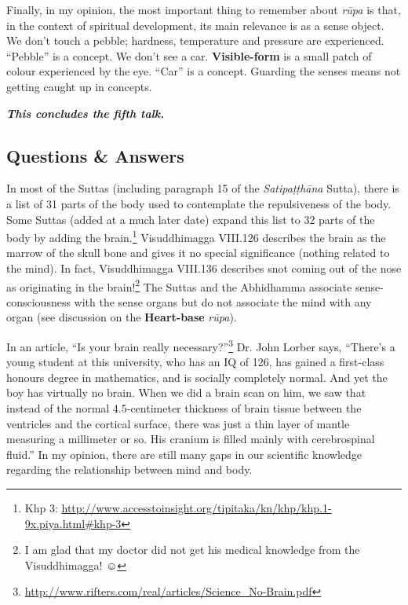 Finally, in my opinion, the most important thing to remember about \textit{rūpa} is that, in the context of spiritual development, its main relevance is as a sense object. We don’t touch a pebble; hardness, temperature and pressure are experienced. “Pebble” is a concept. We don’t see a car. \textbf{Visible-form} is a small patch of colour experienced by the eye. “Car” is a concept. Guarding the senses means not getting caught up in concepts.

\begin{center}
\textbf{\textit{This concludes the fifth talk.}} \\
\end{center}

\newpage

\subsection*{Questions \& Answers}


In most of the Suttas (including paragraph 15 of the \textit{Satipaṭṭhāna} Sutta), there is a list of 31 parts of the body used to contemplate the repulsiveness of the body. Some Suttas (added at a much later date) expand this list to 32 parts of the body by adding the brain.\footnote{Khp 3: \url{http://www.accesstoinsight.org/tipitaka/kn/khp/khp.1-9x.piya.html\#khp-3}} Visuddhimagga VIII.126 describes the brain as the marrow of the skull bone and gives it no special significance (nothing related to the mind). In fact, Visuddhimagga VIII.136 describes snot coming out of the nose as originating in the brain!\footnote{I am glad that my doctor did not get his medical knowledge from the Visuddhimagga! ☺} The Suttas and the Abhidhamma associate sense-consciousness with the sense organs but do not associate the mind with any organ (see discussion on the \textbf{Heart-base} \textit{rūpa}).

In an article, “Is your brain really necessary?”\footnote{\url{http://www.rifters.com/real/articles/Science\_No-Brain.pdf}} Dr. John Lorber says, “There’s a young student at this university, who has an IQ of 126, has gained a first-class honours degree in mathematics, and is socially completely normal. And yet the boy has virtually no brain. When we did a brain scan on him, we saw that instead of the normal 4.5-centimeter thickness of brain tissue between the ventricles and the cortical surface, there was just a thin layer of mantle measuring a millimeter or so. His cranium is filled mainly with cerebrospinal fluid.” In my opinion, there are still many gaps in our scientific knowledge regarding the relationship between mind and body.

